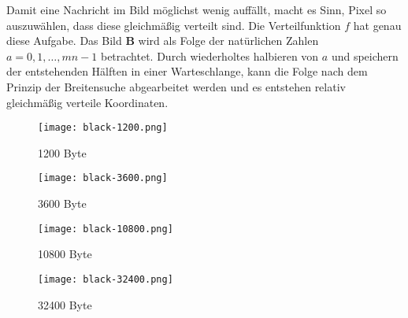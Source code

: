 Damit eine Nachricht im Bild möglichst wenig auffällt, macht es Sinn, Pixel
so auszuwählen, dass diese gleichmäßig verteilt sind. Die Verteilfunktion $f$ hat genau diese
Aufgabe. Das Bild $\mathbf{B}$ wird als Folge der natürlichen Zahlen
$a = 0,1,\ldots,mn - 1$ betrachtet. Durch wiederholtes halbieren von $a$ und
speichern der entstehenden Hälften in einer Warteschlange, kann die Folge nach
dem Prinzip der Breitensuche abgearbeitet werden und es entstehen relativ gleichmäßig
verteile Koordinaten.
\begin{figure}
  \centering
  \begin{minipage}[t]{0.45\textwidth}
    \texttt{[image: black-1200.png]}
    \caption*{1200 Byte}
  \end{minipage}
  \hfill
  \begin{minipage}[t]{0.45\textwidth}
    \texttt{[image: black-3600.png]}
    \caption*{3600 Byte}
  \end{minipage}%
  \vspace{0.5cm}
  \begin{minipage}[t]{0.45\textwidth}
    \texttt{[image: black-10800.png]}
    \caption*{10800 Byte}
  \end{minipage}
  \hfill
  \begin{minipage}[t]{0.45\textwidth}
    \texttt{[image: black-32400.png]}
    \caption*{32400 Byte}
  \end{minipage}
\end{figure}